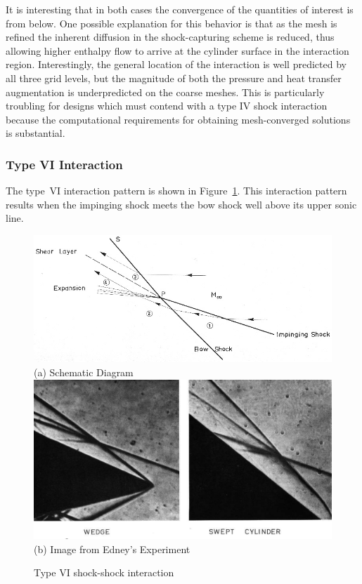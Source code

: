 It is interesting that in both cases the convergence of the quantities of interest is from below.  One possible explanation for this behavior is that as the mesh is refined the inherent diffusion in the shock-capturing scheme is reduced, thus allowing higher enthalpy flow to arrive at the cylinder surface in the interaction region.  Interestingly, the general location of the interaction is well predicted by all three grid levels, but the magnitude of both the pressure and heat transfer augmentation is underpredicted on the coarse meshes.  This is particularly troubling for designs which must contend with a type IV shock interaction because the computational requirements for obtaining mesh-converged solutions is substantial.

\subsubsection{Type VI Interaction}
The type~VI interaction pattern is shown in Figure~\ref{fig:type6}. This interaction pattern results when the impinging shock meets the bow shock well above its upper sonic line.  
\begin{figure}[hbtp]
  \begin{center}
    \includegraphics[width=\textwidth]{figures/edney/type6_schem} \\
    (a) Schematic Diagram \\ \vspace{12pt}
    \includegraphics[width=\textwidth]{figures/edney/type6} \\
    (b) Image from Edney's Experiment 
    \caption[Type VI shock-shock interaction]{Type VI shock-shock interaction~\cite{edney-ssi}}
    \label{fig:type6}
  \end{center}
\end{figure}
